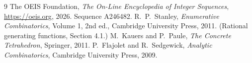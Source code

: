 \documentclass[11pt,a4paper]{article}
\theoremstyle{plain}
\theoremstyle{definition}
\begin{document}
\begin{thebibliography}{9}
 The OEIS Foundation, \emph{The On-Line Encyclopedia of Integer
Sequences}, \url{https://oeis.org}, 2026. Sequence A246482.
 R.~P.~Stanley, \emph{Enumerative Combinatorics}, Volume 1, 2nd ed.,
Cambridge University Press, 2011. (Rational generating functions, Section 4.1.)
 M.~Kauers and P.~Paule, \emph{The Concrete Tetrahedron}, Springer, 2011.
 P.~Flajolet and R.~Sedgewick, \emph{Analytic Combinatorics}, Cambridge
University Press, 2009.
\end{thebibliography}
\end{document}
